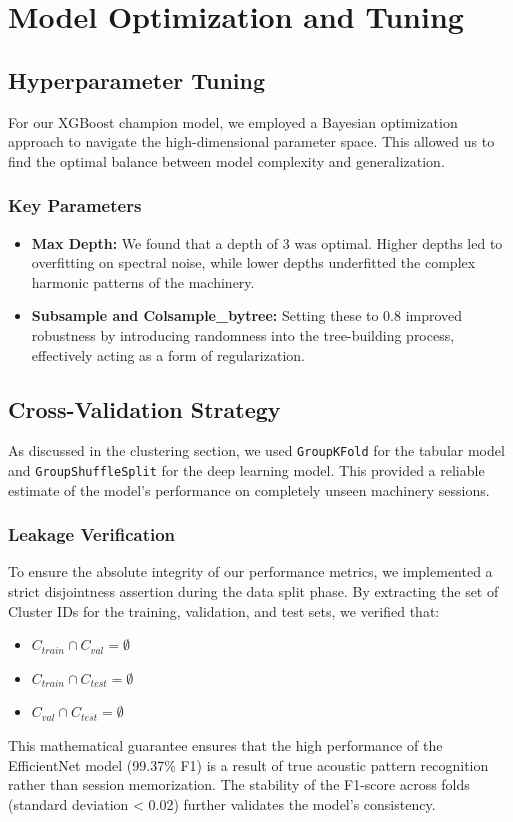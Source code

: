 \chapter{Model Optimization and Tuning}

\section{Hyperparameter Tuning}
For our XGBoost champion model, we employed a Bayesian optimization approach to navigate the high-dimensional parameter space. This allowed us to find the optimal balance between model complexity and generalization.

\subsection{Key Parameters}
\begin{itemize}
    \item \textbf{Max Depth:} We found that a depth of 3 was optimal. Higher depths led to overfitting on spectral noise, while lower depths underfitted the complex harmonic patterns of the machinery.
    \item \textbf{Subsample and Colsample\_bytree:} Setting these to 0.8 improved robustness by introducing randomness into the tree-building process, effectively acting as a form of regularization.
\end{itemize}

\section{Cross-Validation Strategy}
As discussed in the clustering section, we used \texttt{GroupKFold} for the tabular model and \texttt{GroupShuffleSplit} for the deep learning model. This provided a reliable estimate of the model's performance on completely unseen machinery sessions. 

\subsection{Leakage Verification}
To ensure the absolute integrity of our performance metrics, we implemented a strict disjointness assertion during the data split phase. By extracting the set of Cluster IDs for the training, validation, and test sets, we verified that:
\begin{itemize}
    \item $C_{train} \cap C_{val} = \emptyset$
    \item $C_{train} \cap C_{test} = \emptyset$
    \item $C_{val} \cap C_{test} = \emptyset$
\end{itemize}
This mathematical guarantee ensures that the high performance of the EfficientNet model (99.37\% F1) is a result of true acoustic pattern recognition rather than session memorization. The stability of the F1-score across folds (standard deviation < 0.02) further validates the model's consistency.

